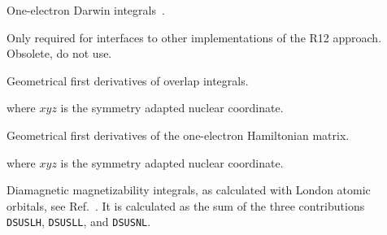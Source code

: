 \begin{description}
\item[] One-electron Darwin integrals~\cite{skjohjajjcp103}.


\item[] Only required for interfaces to other
  implementations of the R12 approach. Obsolete, do not use.

\item[] Geometrical first derivatives of overlap
integrals.

where $xyz$ is the symmetry adapted nuclear coordinate.

\item[] Geometrical first derivatives of the one-electron
Hamiltonian matrix.

where $xyz$ is the symmetry adapted nuclear coordinate.

\item[] Diamagnetic magnetizability integrals, as
calculated with London atomic orbitals, see
Ref.~\cite{thpjjcp95}. It is calculated as the sum of the three
contributions \verb|DSUSLH|, \verb|DSUSLL|, and \verb|DSUSNL|.



\end{description}
